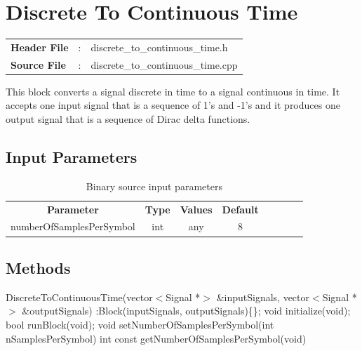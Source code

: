 \clearpage

\section{Discrete To Continuous Time}

\begin{tcolorbox}	
	\begin{tabular}{p{2.75cm} p{0.2cm} p{10.5cm}} 	
		\textbf{Header File}   &:& discrete\_to\_continuous\_time.h \\
		\textbf{Source File}   &:& discrete\_to\_continuous\_time.cpp \\
	\end{tabular}
\end{tcolorbox}

This block converts a signal discrete in time to a signal continuous in time. It accepts one input signal that is a sequence of 1's and -1's and it produces one output signal that is a sequence of Dirac delta functions.

\subsection*{Input Parameters}

\begin{table}[h]
	\centering
	\begin{tabular}{|c|c|c|c|cccc}
		\cline{1-4}
		\textbf{Parameter} & \textbf{Type} & \textbf{Values} &   \textbf{Default}& \\ \cline{1-4}
		numberOfSamplesPerSymbol & int & any & $8$ \\ \cline{1-4}
	\end{tabular}
	\caption{Binary source input parameters}
	\label{table:disc2cont_in_par}
\end{table}


\subsection*{Methods}

DiscreteToContinuousTime(vector$<$Signal *$>$ \&inputSignals, vector$<$Signal *$>$ \&outputSignals) :Block(inputSignals, outputSignals)\{\};
\bigbreak	
void initialize(void);
\bigbreak	
bool runBlock(void);
\bigbreak	
void setNumberOfSamplesPerSymbol(int nSamplesPerSymbol)
\bigbreak
int const getNumberOfSamplesPerSymbol(void)

